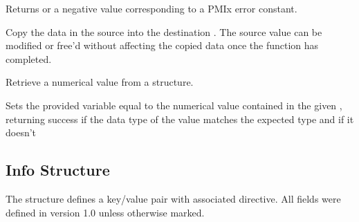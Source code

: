 \begin{arglist}
\end{arglist}

Returns  or a negative value corresponding to a PMIx error constant.

\descr

Copy the data in the source  into the destination . The source value can be modified or free'd without affecting the copied data once the function has completed.


Retrieve a numerical value from a  structure.


\begin{arglist}
\end{arglist}

Sets the provided variable equal to the numerical value contained in the given , returning success if the data type of the value matches the expected type and  if it doesn't

\subsection{Info Structure}
\label{chap:struct:info}

The  structure defines a key/value pair with associated directive. All fields were defined in version 1.0 unless otherwise marked.


